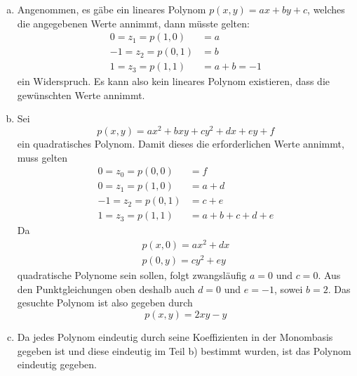 \documentclass[a4paper]{scrartcl}
\begin{document}
\begin{aufgabe}
		\begin{enumerate}[a)]
			\item
				Angenommen, es gäbe ein lineares Polynom $p(x,y) = ax + by + c$, welches die angegebenen Werte annimmt, dann müsste gelten:
				\begin{align*}
					0 = z_1 = p(1,0) &= a \\
					-1 = z_2 = p(0,1) &= b \\
					1 = z_3 = p(1,1) &= a + b = -1
				\end{align*}
				ein Widerspruch.
				Es kann also kein lineares Polynom existieren, dass die gewünschten Werte annimmt.
			\item
				Sei
				\[
					p(x,y) = ax^2 + bxy + cy^2 + dx + ey + f
				\]
				ein quadratisches Polynom.
				Damit dieses die erforderlichen Werte annimmt, muss gelten
				\begin{align*}
					0 = z_0 = p(0,0) &= f \\
					0 = z_1 = p(1,0) &= a + d \\
					-1 = z_2 = p(0,1) &= c + e \\
					1 = z_3 = p(1,1) &= a + b + c + d + e
				\end{align*}
				Da
				\begin{align*}
					p(x,0) = ax^2 + dx \\
					p(0,y) = cy^2 + ey
				\end{align*}
				quadratische Polynome sein sollen, folgt zwangsläufig $a=0$ und $c=0$.
				Aus den Punktgleichungen oben deshalb auch $d=0$ und $e=-1$, sowei $b=2$.
				Das gesuchte Polynom ist also gegeben durch
				\[
					p(x,y) = 2xy - y
				\]
			\item
				Da jedes Polynom eindeutig durch seine Koeffizienten in der Monombasis gegeben ist und diese eindeutig im Teil b) bestimmt wurden, ist das Polynom eindeutig gegeben.
		\end{enumerate}
\end{aufgabe}
\end{document}
